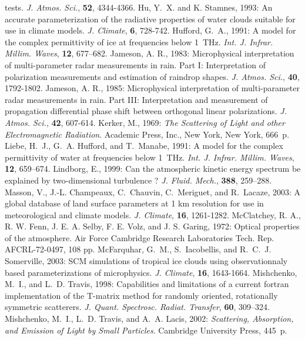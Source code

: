   tests. {\it J. Atmos. Sci.}, {\bf 52}, 4344-4366.
\decrefname
Hu, Y.~X. and K. Stamnes, 1993:
   An accurate parameterization of the radiative properties of water clouds
   suitable for use in climate models. {\it J. Climate}, {\bf 6}, 728-742.
\decrefname
Hufford, G.~A., 1991: A model for the complex permittivity of ice at
  frequencies below 1~{THz}. {\em Int. J. Infrar. Millim. Waves}, {\bf 12},
  677--682.
\decrefname
Jameson, A. R., 1983:
      Microphysical interpretation of multi-parameter radar measurements in
      rain. Part I: Interpretation of polarization measurements and estimation
      of raindrop shapes.
      {\it J. Atmos. Sci.},
      {\bf 40},
      1792-1802.
\decrefname
Jameson, A. R., 1985:
      Microphysical interpretation of multi-parameter radar measurements in
      rain. Part III: Interpretation and measurement of propagation 
      differential phase shift between orthogonal linear polarizations.
      {\it J. Atmos. Sci.},
      {\bf 42},
      607-614.
\decrefname
Kerker, M., 1969: {\em The Scattering of Light and other Electromagnetic
  Radiation}. Academic Press, Inc., New York, New York, 666~p.
\decrefname
Liebe, H.~J., G.~A. Hufford, and T.~Manabe, 1991: A model for the complex
  permittivity of water at frequencies below 1~{THz}. {\em Int. J. Infrar.
  Millim. Waves}, {\bf 12}, 659--674.
\decrefname
Lindborg, E., 1999: Can the atmospheric kinetic energy spectrum be explained
  by two-dimensional turbulence ? {\em J. Fluid. Mech.}, {\bf 388},
  259--288.
\decrefname
Masson, V., J.-L. Champeaux, C.~Chauvin, C.~Meriguet, and R.~Lacaze, 2003:
  A global database of land surface parameters at 1 km resolution for use in
  meteorological and climate models. {\it J. Climate}, {\bf 16}, 1261-1282.
\decrefname
McClatchey, R. A., R. W. Fenn, J. E. A. Selby, F. E. Volz, and J. S.
  Garing, 1972: Optical properties of the atmosphere. Air Force
  Cambridge Research Laboratories Tech. Rep. AFCRL-72-0497, 108 pp.
\decrefname
McFarquhar, G.~M., S.~Iacobellis, and R.~C.~J. Somerville, 2003: 
  SCM simulations of tropical ice clouds using observationnaly based
  parameterizations of microphysics. {\it J. Climate}, {\bf 16}, 1643-1664.
\decrefname
Mishchenko, M.~I., and L.~D. Travis, 1998: Capabilities and limitations of a
  current {\sc fortran} implementation of the {T}-matrix method for randomly
  oriented, rotationally symmetric scatterers. {\em J. Quant. Spectrosc.
  Radiat. Transfer}, {\bf 60}, 309--324.
\decrefname
Mishchenko, M.~I., L.~D. Travis, and A.~A. Lacis, 2002: {\em Scattering, Absorption, and
  Emission of Light by Small Particles}. Cambridge University Press, 445~p.

